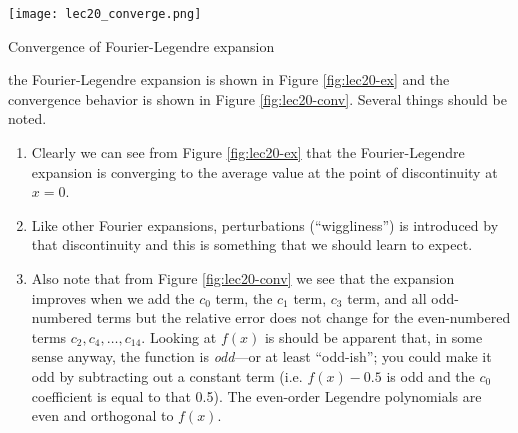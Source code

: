 \begin{marginfigure}
\texttt{[image: lec20\_converge.png]}
\caption{Convergence of Fourier-Legendre expansion}
\label{fig:lec20-conv}
\end{marginfigure}
 the Fourier-Legendre expansion is shown in Figure \ref{fig:lec20-ex} and the convergence behavior is shown in Figure \ref{fig:lec20-conv}.  Several things should be noted.
\begin{enumerate}
\item Clearly we can see from Figure \ref{fig:lec20-ex} that the Fourier-Legendre expansion is converging to the average value at the point of discontinuity at $x=0$.  
\item Like other Fourier expansions, perturbations (``wiggliness'') is introduced by that discontinuity and this is something that we should learn to expect.
\item Also note that from Figure \ref{fig:lec20-conv} we see that the expansion improves when we add the $c_0$ term, the $c_1$ term, $c_3$ term, and all odd-numbered terms but the relative error does not change for the even-numbered terms $c_2,c_4,\dots,c_{14}$.  Looking at $f(x)$ is should be apparent that, in some sense anyway, the function is \emph{odd}---or at least ``odd-ish''; you could make it odd by subtracting out a constant term (i.e. $f(x) - 0.5$ is odd and the $c_0$ coefficient is equal to that 0.5). The even-order Legendre polynomials are even and orthogonal to $f(x)$.  
\end{enumerate}
